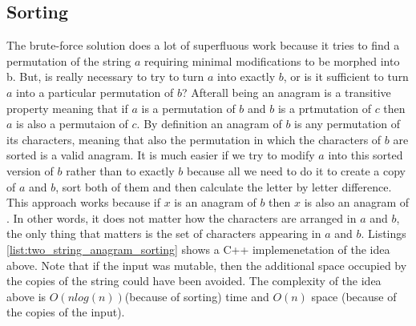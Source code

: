 \subsection{Sorting}
\label{sec:anagrams:sorting}
The brute-force solution does a lot of superfluous work because it tries to find a permutation of the string $a$
requiring  minimal modifications to be morphed into b.
But, is really necessary to try to turn $a$ into exactly $b$, or is it sufficient to turn $a$ into a particular permutation of $b$? 
Afterall being an anagram is a transitive property meaning that if $a$ is a permutation of $b$ and $b$ is a prtmutation of $c$ then $a$ is also a permutaion of $c$. 
By definition an anagram of $b$ is any permutation of its characters, meaning that also the permutation in which the characters of $b$ are sorted is a valid
anagram. It is much easier if we try to modify $a$ into this sorted version of $b$ rather than to exactly $b$ because all we need to do it to create
a copy of $a$ and $b$, sort both of them and then calculate the letter by letter difference.
This approach works because if $x$ is an anagram of $b$ then $x$ is also an
anagram of . In other words, it does not matter how the characters are arranged in $a$ and $b$, the only thing that matters is the set of characters
appearing in $a$ and $b$. Listings \ref{list:two_string_anagram_sorting} shows a C++ implemenetation of the idea above. 
Note that if the input was mutable, then the additional space occupied by the copies of the string
could have been avoided. The complexity of the idea above is $O(n log(n))$(because of sorting) time and $O(n)$ space (because of the copies of the input).


 	


